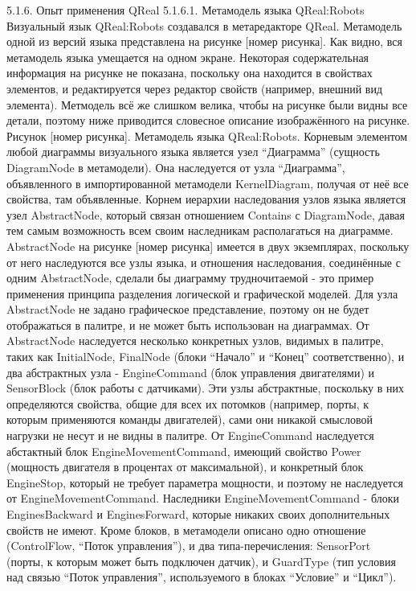 5.1.6. Опыт применения QReal
5.1.6.1. Метамодель языка QReal:Robots
	Визуальный язык QReal:Robots создавался в метаредакторе QReal. Метамодель одной из версий языка представлена на рисунке [номер рисунка]. Как видно, вся метамодель языка умещается на одном экране. Некоторая содержательная информация на рисунке не показана, поскольку она находится в свойствах элементов, и редактируется через редактор свойств (например, внешний вид элемента). Метмодель всё же слишком велика, чтобы на рисунке были видны все детали, поэтому ниже приводится словесное описание изображённого на рисунке.
Рисунок [номер рисунка]. Метамодель языка QReal:Robots.
	Корневым элементом любой диаграммы визуального языка является узел “Диаграмма” (сущность DiagramNode в метамодели). Она наследуется от узла “Диаграмма”, объявленного в импортированной метамодели KernelDiagram, получая от неё все свойства, там объявленные. Корнем иерархии наследования узлов языка является узел AbstractNode, который связан отношением Contains с DiagramNode, давая тем самым возможность всем своим наследникам располагаться на диаграмме. AbstractNode на рисунке [номер рисунка] имеется в двух экземплярах, поскольку от него наследуются все узлы языка, и отношения наследования, соединённые с одним AbstractNode, сделали бы диаграмму трудночитаемой - это пример применения принципа разделения логической и графической моделей. Для узла AbstractNode не задано графическое представление, поэтому он не будет отображаться в палитре, и не может быть использован на диаграммах. От AbstractNode наследуется несколько конкретных узлов, видимых в палитре, таких как InitialNode, FinalNode (блоки “Начало” и “Конец” соответственно), и два абстрактных узла - EngineCommand (блок управления двигателями) и SensorBlock (блок работы с датчиками). Эти узлы абстрактные, поскольку в них определяются свойства, общие для всех их потомков (например, порты, к которым применяются команды двигателей), сами они никакой смысловой нагрузки не несут и не видны в палитре. От EngineCommand наследуется абстактный блок EngineMovementCommand, имеющий свойство Power (мощность двигателя в процентах от максимальной), и конкретный блок EngineStop, который не требует параметра мощности, и поэтому не наследуется от EngineMovementCommand. Наследники EngineMovementCommand - блоки EnginesBackward и EnginesForward, которые никаких своих дополнительных свойств не имеют. Кроме блоков, в метамодели описано одно отношение (ControlFlow, “Поток управления”), и два типа-перечисления: SensorPort (порты, к которым может быть подключен датчик), и GuardType (тип условия над связью “Поток управления”, используемого в блоках “Условие” и “Цикл”).
